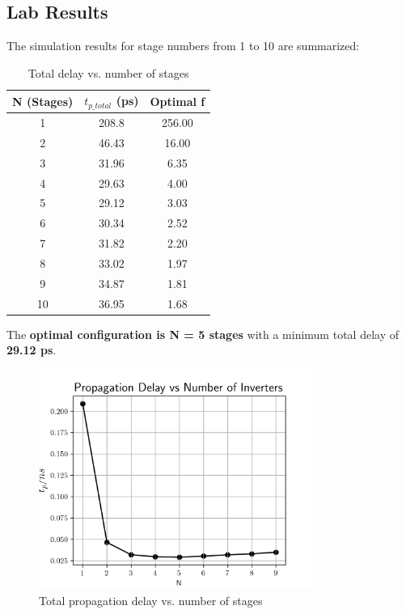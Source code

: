 \documentclass[UTF8,12pt,a4paper]{ctexart}
\begin{document}
\subsection{Lab Results}

The simulation results for stage numbers from 1 to 10 are summarized:

\begin{table}[h]
\centering
\begin{tabular}{|c|c|c|}
\hline
\textbf{N (Stages)} & \textbf{$t_{p\_total}$ (ps)} & \textbf{Optimal f} \\
\hline
1 & 208.8 & 256.00 \\
2 & 46.43 & 16.00 \\
3 & 31.96 & 6.35 \\
4 & 29.63 & 4.00 \\
5 & 29.12 & 3.03 \\
6 & 30.34 & 2.52 \\
7 & 31.82 & 2.20 \\
8 & 33.02 & 1.97 \\
9 & 34.87 & 1.81 \\
10 & 36.95 & 1.68 \\
\hline
\end{tabular}
\caption{Total delay vs. number of stages}
\end{table}

The \textbf{optimal configuration is N = 5 stages} with a minimum total delay of \textbf{29.12 ps}.

\begin{figure}[h]
\centering
\includegraphics[width=0.8\textwidth]{Task5/tp_N.png}
\caption{Total propagation delay vs. number of stages}
\label{fig:task5_delay}
\end{figure}
\end{document}
